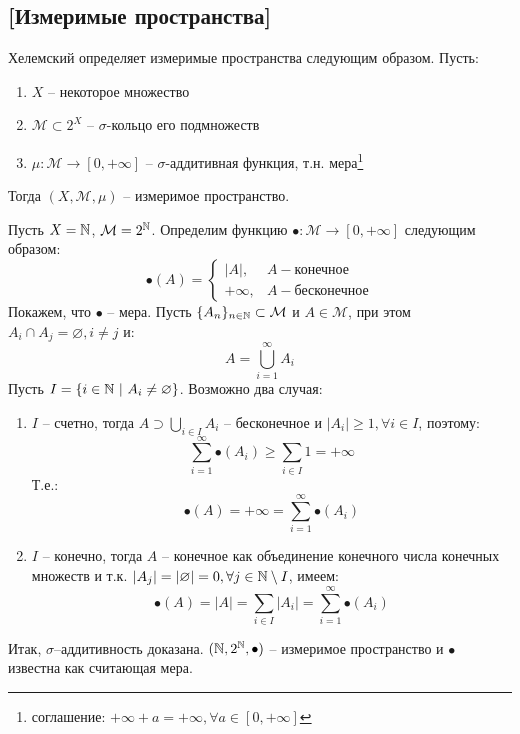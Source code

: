 \documentclass[../main.tex]{subfiles}
\begin{document}
\subsection{[Измеримые пространства]}

Хелемский определяет измеримые пространства следующим образом. Пусть:
\begin{enumerate}
	\item $X$ -- некоторое множество
	\item $\mathcal{M} \subset 2^X$ -- $\sigma$-кольцо его подмножеств
	\item $\mu : \mathcal{M} \to [0, +\infty]$ -- $\sigma$-аддитивная функция, т.н. мера\footnote{соглашение: $+\infty + a = +\infty, \forall a \in [0, +\infty]$}
\end{enumerate}

Тогда $(X, \mathcal{M}, \mu)$ -- измеримое пространство. 

\begin{example}
	Пусть $X = \mathbb{N}$, $\mathcal{M} = 2^{\mathbb{N}}$. Определим функцию $\bullet : \mathcal{M} \to [0, +\infty]$ следующим образом:
	\begin{equation}
		\bullet (A) = \begin{cases}|A|, &A - \text{конечное} \\ +\infty, &A - \text{бесконечное}\end{cases}
	\end{equation}
	Покажем, что $\bullet$ -- мера. Пусть $\{A_n\}_{n \in \mathbb{N}} \subset \mathcal{M}$ и $A \in \mathcal{M}$, при этом \\ $A_i \cap A_j = \varnothing, i \neq j$ и:
	$$A = \bigcup_{i=1}^{\infty}{A_i}$$
	Пусть $I = \{i \in \mathbb{N} \ | \ A_i \neq \varnothing \}$. Возможно два случая:
	
	\begin{enumerate}
		\item $I$ -- счетно, тогда $A \supset \bigcup\limits_{i \in I}{A_i}$ -- бесконечное и $|A_i| \geq 1, \forall i \in I$, поэтому:
		$$\sum_{i=1}^{\infty}{\bullet(A_i)} \geq \sum_{i \in I}{1} = +\infty$$
		Т.е.:
		$$\bullet(A) = +\infty = \sum_{i=1}^{\infty}{\bullet(A_i)}$$
		\item $I$ -- конечно, тогда $A$ -- конечное как объединение конечного числа конечных множеств и т.к. $|A_j| = |\varnothing| = 0, \forall j \in \mathbb{N} \setminus I$, имеем:
		$$\bullet(A) = |A| = \sum\limits_{i \in I}{|A_i|} = \sum\limits_{i=1}^{\infty}{\bullet(A_i)}$$
	\end{enumerate}
	
	Итак, $\sigma$--аддитивность доказана. $(\mathbb{N}, 2^{\mathbb{N}}, \bullet)$ -- измеримое пространство и $\bullet$ известна как считающая мера.
\end{example}
\end{document}
